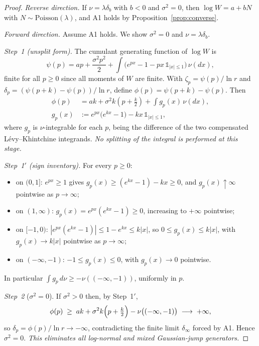 \documentclass[pdflatex,sn-mathphys-num]{sn-jnl}
\theoremstyle{thmstyleone}
\theoremstyle{thmstyletwo}
\theoremstyle{thmstylethree}
\begin{document}
\begin{proof}
\textit{Reverse direction.} If $\nu = \lambda\delta_b$ with $b < 0$
and $\sigma^2 = 0$, then $\log W = a + bN$ with $N \sim
\mathrm{Poisson}(\lambda)$, and A1 holds by
Proposition~\ref{prop:converse}.

\textit{Forward direction.}  Assume A1 holds.  We show $\sigma^2 = 0$
and $\nu = \lambda\delta_b$.

\textit{Step~1 (unsplit form).}  The cumulant generating function of
$\log W$ is
\[
  \psi(p) = ap + \frac{\sigma^2 p^2}{2}
  + \int\bigl(e^{px} - 1 - px\,\mathds{1}_{|x|\leq 1}\bigr)
  \,\nu(dx),
\]
finite for all $p \ge 0$ since all moments of $W$ are finite.  With
$\zeta_p = \psi(p)/\ln r$ and $\delta_p = (\psi(p+k) -
\psi(p))/\ln r$, define $\phi(p) = \psi(p+k) - \psi(p)$.  Then
\[
\begin{aligned}
  \phi(p) &= ak + \sigma^2 k\!\left(p + \tfrac{k}{2}\right)
  + \int g_p(x)\,\nu(dx),\\
  g_p(x) &:= e^{px}\bigl(e^{kx}-1\bigr) - kx\,\mathds{1}_{|x|\leq 1},
\end{aligned}
\]
where $g_p$ is $\nu$-integrable for each $p$, being the difference of
the two compensated L\'evy--Khintchine integrands.  \emph{No
splitting of the integral is performed at this stage.}

\textit{Step~1$'$ (sign inventory).}  For every $p \ge 0$:
\begin{itemize}
\item on $(0,1]$: $e^{px} \ge 1$ gives $g_p(x) \ge (e^{kx}-1) - kx
  \ge 0$, and $g_p(x) \uparrow \infty$ pointwise as $p \to \infty$;
\item on $(1,\infty)$: $g_p(x) = e^{px}(e^{kx}-1) \ge 0$, increasing
  to $+\infty$ pointwise;
\item on $[-1,0)$: $|e^{px}(e^{kx}-1)| \le 1 - e^{kx} \le k|x|$, so
  $0 \le g_p(x) \le k|x|$, with $g_p(x) \to k|x|$ pointwise as
  $p \to \infty$;
\item on $(-\infty,-1)$: $-1 \le g_p(x) \le 0$, with $g_p(x) \to 0$
  pointwise.
\end{itemize}
In particular $\int g_p\,d\nu \ge -\nu((-\infty,-1))$, uniformly in
$p$.

\textit{Step~2} ($\sigma^2 = 0$).  If $\sigma^2 > 0$ then, by
Step~1$'$,
\[
  \phi(p) \;\ge\; ak + \sigma^2 k\Bigl(p + \tfrac{k}{2}\Bigr)
  - \nu\bigl((-\infty,-1)\bigr) \;\longrightarrow\; +\infty,
\]
so $\delta_p = \phi(p)/\ln r \to -\infty$, contradicting the finite
limit $\delta_\infty$ forced by A1.  Hence $\sigma^2 = 0$.
\textit{This eliminates all log-normal and mixed Gaussian-jump
generators.}


\end{proof}
\end{document}

